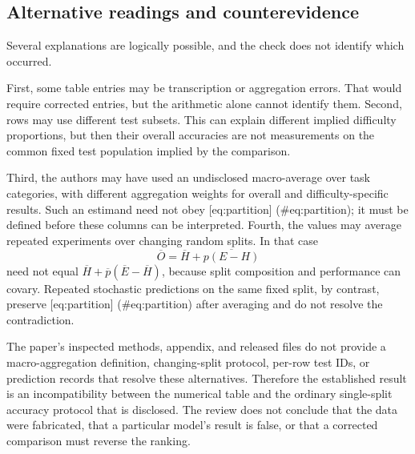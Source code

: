 \documentclass[10pt]{article}
\begin{document}
\subsection*{Alternative readings and counterevidence}
Several explanations are logically possible, and the check does not identify which occurred.\par
First, some table entries may be transcription or aggregation errors. That would require corrected entries, but the arithmetic alone cannot identify them. Second, rows may use different test subsets. This can explain different implied difficulty proportions, but then their overall accuracies are not measurements on the common fixed test population implied by the comparison.\par
Third, the authors may have used an undisclosed macro-average over task categories, with different aggregation weights for overall and difficulty-specific results. Such an estimand need not obey [eq:partition] (\#eq:partition); it must be defined before these columns can be interpreted. Fourth, the values may average repeated experiments over changing random splits. In that case \[\overline O
 =\overline H+\overline{p(E-H)}\] need not equal \(\overline H+\overline p(\overline E-\overline H)\), because split composition and performance can covary. Repeated stochastic predictions on the same fixed split, by contrast, preserve [eq:partition] (\#eq:partition) after averaging and do not resolve the contradiction.\par
The paper’s inspected methods, appendix, and released files do not provide a macro-aggregation definition, changing-split protocol, per-row test IDs, or prediction records that resolve these alternatives. Therefore the established result is an incompatibility between the numerical table and the ordinary single-split accuracy protocol that is disclosed. The review does not conclude that the data were fabricated, that a particular model’s result is false, or that a corrected comparison must reverse the ranking.\par
\end{document}
